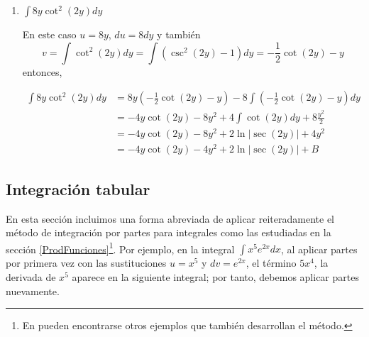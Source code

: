 \begin{enumerate}[leftmargin=1.2em,   itemindent=0pt,       labelwidth=\labelwidth,labelsep=0.5em,]
\item $\displaystyle{\int 8y\cot ^{2}(2y)dy}$

En este caso $u=8y$, $du=8dy$ y también \[v=\displaystyle{\int\cot^{2}(2y)dy}=\displaystyle{\int\left(\csc^{2}(2y)-1\right) dy}=-\frac{1}{2}\cot (2y)-y\] entonces,

{\small
\begin{align*}
\int 8y\cot ^{2}(2y)dy&=8y\left(-\frac{1}{2}\cot (2y)-y\right)-8\int\left( -\frac{1}{2}\cot (2y)-y\right)dy\\
&=-4y\cot (2y)-8y^{2}+4\int \cot (2y)dy+8\frac{y^{2}}{2}\\
&=-4y\cot (2y)-8y^{2}+2\ln |\sec (2y)|+4y^{2}\\
&=-4y\cot (2y)-4y^{2}+2\ln |\sec (2y)|+B 
\end{align*}
}

\end{enumerate}

\subsection*{Integración tabular}\label{tabular}

En esta sección incluimos una forma abreviada de aplicar reiteradamente el método de integración por partes para integrales como las estudiadas en la sección \ref{ProdFunciones}\footnote{En \textcite{thomas_calculo_2010} pueden encontrarse otros ejemplos que también desarrollan el método.}. Por ejemplo, en la integral
{\footnotesize $\displaystyle{\int x^{5}e^{2x}dx}$}, al aplicar partes por primera vez con las sustituciones $u=x^5$ y $dv=e^{2x}$, el término $5x^4$, la derivada de $x^5$ aparece en la siguiente integral; por tanto, debemos aplicar partes nuevamente. 

